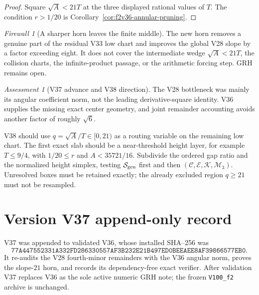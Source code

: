 \documentclass[11pt]{article}
\theoremstyle{definition}
\theoremstyle{remark}
\newtheorem{assessment}[theorem]{Assessment}
\newtheorem{firewall}[theorem]{Firewall}
\begin{document}
\begin{proof}
Square \(\sqrt A<21T\) at the three displayed rational values of \(T\).
The condition \(r>1/20\) is Corollary~\ref{cor:f2v36-annular-pruning}.
\end{proof}

\begin{firewall}[A sharper horn leaves the finite middle]
\label{fire:f2v37}
The new horn removes a genuine part of the residual V33 low chart and
improves the global V28 slope by a factor exceeding eight.  It does not
cover the intermediate wedge \(\sqrt A<21T\), the collision charts, the
infinite-product passage, or the arithmetic forcing step.  GRH remains
open.
\end{firewall}

\begin{assessment}[V37 advance and V38 direction]
\label{ass:f2v37}
The V28 bottleneck was mainly its angular coefficient norm, not the
leading derivative-square identity.  V36 supplies the missing exact
center geometry, and joint remainder accounting avoids another factor of
roughly \(\sqrt6\).

V38 should use \(q=\sqrt A/T\in[0,21)\) as a routing variable on the
remaining low chart.  The first exact slab should be a near-threshold
height layer, for example \(T\leq9/4\), with
\(1/20\leq r\) and \(A<35721/16\).  Subdivide the ordered gap ratio and
the normalized height simplex, testing \(\mathcal S_{\rm gen}\) first and
then \((\mathcal C,\mathcal E,\mathcal K,\mathcal M_3)\).  Unresolved
boxes must be retained exactly; the already excluded region \(q\geq21\)
must not be resampled.
\end{assessment}

\section*{Version V37 append-only record}

V37 was appended to validated V36, whose installed SHA--256 was
\[
 \texttt{77A447552331A332FD286330557AF3B232E21B497ED0BEEAEE8AF39866577EB0}.
\tag{N37.19}
\]
It re-audits the V28 fourth-minor remainders with the V36 angular norm,
proves the slope-\(21\) horn, and records its dependency-free exact
verifier.  After validation V37 replaces V36 as the sole active numeric
GRH note; the frozen \texttt{V100\_f2} archive is unchanged.

\end{document}
